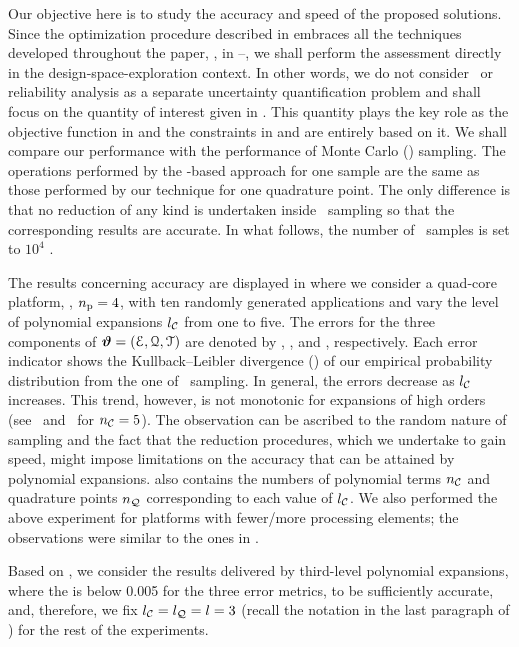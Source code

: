 Our objective here is to study the accuracy and speed of the proposed solutions.
Since the optimization procedure described in  embraces all the techniques developed throughout the paper, \ie, in --, we shall perform the assessment directly in the design-space-exploration context.
In other words, we do not consider \ta\ or reliability analysis as a separate uncertainty quantification problem and shall focus on the quantity of interest given in .
This quantity plays the key role as the objective function in  and the constraints in  and  are entirely based on it.
We shall compare our performance with the performance of Monte Carlo (\MC) sampling.
The operations performed by the \MC-based approach for one sample are the same as those performed by our technique for one quadrature point.
The only difference is that no reduction of any kind is undertaken inside \MC\ sampling so that the corresponding results are accurate.
In what follows, the number of \MC\ samples is set to $10^4$ \cite{ukhov2014, lee2013, juan2012, xiang2010}.


The results concerning accuracy are displayed in  where we consider a quad-core platform, \ie, ${n_\text{p}} = 4$, with ten randomly generated applications and vary the level of polynomial expansions ${l_\mathcal{C}}$ from one to five.
The errors for the three components of $\bm{\vartheta} = (\EuScript{E}, \EuScript{Q}, \EuScript{T})$ are denoted by \errorE, \errorQ, and \errorT, respectively.
Each error indicator shows the Kullback--Leibler divergence () of our empirical probability distribution from the one of \MC\ sampling.
In general, the errors decrease as ${l_\mathcal{C}}$ increases.
This trend, however, is not monotonic for expansions of high orders (see \errorQ\ and \errorT\ for ${n_\mathcal{C}} = 5$).
The observation can be ascribed to the random nature of sampling and the fact that the reduction procedures, which we undertake to gain speed, might impose limitations on the accuracy that can be attained by polynomial expansions.
 also contains the numbers of polynomial terms ${n_\mathcal{C}}$ and quadrature points ${n_\mathcal{Q}}$ corresponding to each value of ${l_\mathcal{C}}$.
We also performed the above experiment for platforms with fewer/more processing elements; the observations were similar to the ones in .

Based on , we consider the results delivered by third-level polynomial expansions, where the  is below 0.005 for the three error metrics, to be sufficiently accurate, and, therefore, we fix ${l_\mathcal{C}} = {l_\mathcal{Q}} = l = 3$ (recall the notation in the last paragraph of ) for the rest of the experiments.

